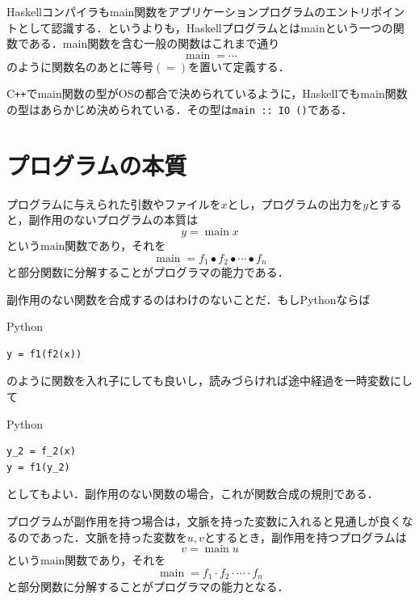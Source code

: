 \documentclass[a4paper]{jsbook}
\newcommand{\programminglanguage}[1]{\textsf{#1}}
\newcommand{\cxx}{\programminglanguage{C}\texttt{++}}
\newcommand{\haskell}{\programminglanguage{Haskell}}
\newcommand{\python}{\programminglanguage{Python}}
\newcommand{\code}[1]{\texttt{#1}}
\newenvironment{pythoncode}{\begin{itembox}[r]{\python}}{\end{itembox}}
\DeclareMathOperator{\mathMain}{main}
\newcommand{\mathCompose}{\mathbin{\bullet}}
\newcommand{\mathGeneralMap}{\mathbin{\cdot}}
\begin{document}
\haskell コンパイラもmain関数をアプリケーションプログラムのエントリポイントとして認識する．というよりも，\haskell プログラムとはmainという一つの関数である．main関数を含む一般の関数はこれまで通り
\begin{equation}
\mathMain=\dotsb
\end{equation}
のように関数名のあとに等号$(=)$を置いて定義する．

\cxx でmain関数の型がOSの都合で決められているように，\haskell でもmain関数の型はあらかじめ決められている．その型は\code{main :: IO ()}である．


\section{プログラムの本質}

プログラムに与えられた引数やファイルを$x$とし，プログラムの出力を$y$とすると，副作用のないプログラムの本質は
\begin{equation}
y=\mathMain x
\end{equation}
という$\text{main}$関数であり，それを
\begin{equation}
\mathMain=f_1\mathCompose f_2\mathCompose\dotsb\mathCompose f_n
\end{equation}
と部分関数に分解することがプログラマの能力である．

副作用のない関数を合成するのはわけのないことだ．もし\python ならば
\begin{pythoncode}
\begin{verbatim}
y = f1(f2(x))
\end{verbatim}
\end{pythoncode}
のように関数を入れ子にしても良いし，読みづらければ途中経過を一時変数にして
\begin{pythoncode}
\begin{verbatim}
y_2 = f_2(x)
y = f1(y_2)
\end{verbatim}
\end{pythoncode}
としてもよい．副作用のない関数の場合，これが関数合成の規則である．

プログラムが副作用を持つ場合は，文脈を持った変数に入れると見通しが良くなるのであった．文脈を持った変数を$u,v$とするとき，副作用を持つプログラムは
\begin{equation}
v=\mathMain u
\end{equation}
という$\text{main}$関数であり，それを
\begin{equation}
\mathMain=f_1\mathGeneralMap f_2\mathGeneralMap\dotsb\mathGeneralMap f_n
\end{equation}
と部分関数に分解することがプログラマの能力となる．
\end{document}
